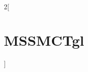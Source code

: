 \documentclass[11pt,twoside]{article}
\begin{document}
\begin{landscape}

\begin{minipage}{25cm}

\begin{large}
\begin{multicols}{2}[\section*{MSSMCTgl}]
\end{multicols}
\end{large}

\end{minipage}

\clearpage

\renewcommand{\arraystretch}{1.5}


\end{landscape}
\end{document}
